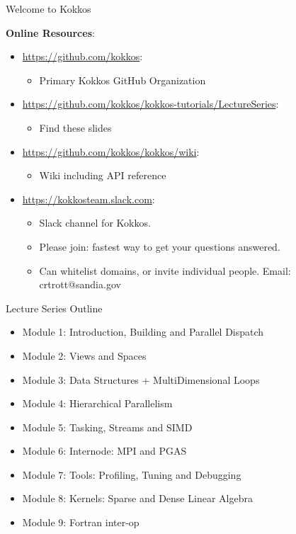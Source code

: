 \begin{frame}{Welcome to Kokkos}

\textbf{Online Resources}:

\begin{itemize}
	\item \url{https://github.com/kokkos}: 
		\begin{itemize}
			\item Primary Kokkos GitHub Organization
		\end{itemize}
	\item \url{https://github.com/kokkos/kokkos-tutorials/LectureSeries}: 
		\begin{itemize}
			\item{Find these slides}
		\end{itemize}
	\item \url{https://github.com/kokkos/kokkos/wiki}: 
		\begin{itemize}
			\item Wiki including API reference
		\end{itemize}
	\item \url{https://kokkosteam.slack.com}: 
		\begin{itemize}
			\item Slack channel for Kokkos.
			\item Please join: fastest way to get your questions answered.
			\item Can whitelist domains, or invite individual people. Email: crtrott@sandia.gov
		\end{itemize}
\end{itemize}

\end{frame}



\begin{frame}{Lecture Series Outline}

\begin{itemize}
	\item Module 1: Introduction, Building and Parallel Dispatch
	\item Module 2: Views and Spaces
	\item Module 3: Data Structures + MultiDimensional Loops
	\item Module 4: Hierarchical Parallelism
	\item Module 5: Tasking, Streams and SIMD
	\item Module 6: Internode: MPI and PGAS
	\item Module 7: Tools: Profiling, Tuning and Debugging
	\item Module 8: Kernels: Sparse and Dense Linear Algebra
    \item Module 9: Fortran inter-op
\end{itemize}
\end{frame}

